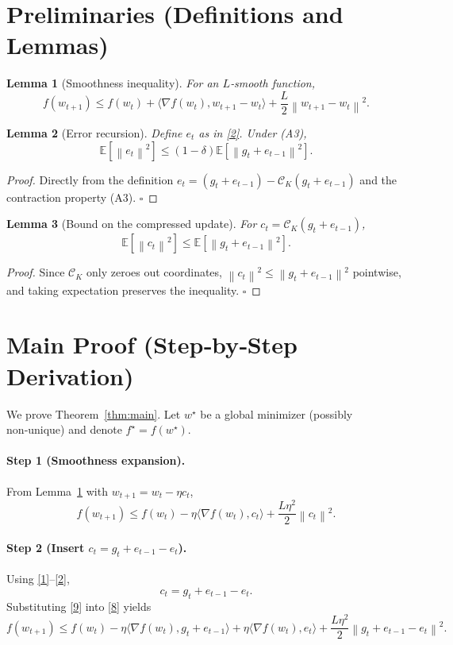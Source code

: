 \documentclass{article}
\newtheorem{lemma}{Lemma}
\newcommand{\E}{\mathbb{E}}
\newcommand{\norm}[1]{\left\|#1\right\|}
\newcommand{\cK}{\mathcal{C}_{K}}
\begin{document}
\section*{Preliminaries (Definitions and Lemmas)}
\begin{lemma}[Smoothness inequality]\label{lem:smooth}
For an $L$‑smooth function,
\[
f(w_{t+1})\le f(w_{t})+\langle\nabla f(w_{t}),w_{t+1}-w_{t}\rangle+\frac{L}{2}\norm{w_{t+1}-w_{t}}^{2}.
\tag{5}
\]
\end{lemma}
\begin{lemma}[Error recursion]\label{lem:error-bound}
Define $e_{t}$ as in \eqref{2}. Under (A3),
\[
\E\!\left[\norm{e_{t}}^{2}\right]\le (1-\delta)\E\!\left[\norm{g_{t}+e_{t-1}}^{2}\right].
\tag{6}
\]
\end{lemma}
\begin{proof}
Directly from the definition $e_{t}= (g_{t}+e_{t-1})-\cK(g_{t}+e_{t-1})$ and the contraction property (A3). \hfill $\square$
\end{proof}
\begin{lemma}[Bound on the compressed update]\label{lem:comp-update}
For $c_{t}= \cK(g_{t}+e_{t-1})$,
\[
\E\!\left[\norm{c_{t}}^{2}\right]\le \E\!\left[\norm{g_{t}+e_{t-1}}^{2}\right].
\tag{7}
\]
\end{lemma}
\begin{proof}
Since $\cK$ only zeroes out coordinates,
$\norm{c_{t}}^{2}\le \norm{g_{t}+e_{t-1}}^{2}$ pointwise, and taking expectation preserves the inequality. \hfill $\square$
\end{proof}

\section*{Main Proof (Step‑by‑Step Derivation)}
We prove Theorem~\ref{thm:main}. Let $w^{\star}$ be a global minimizer (possibly non‑unique) and denote $f^{\star}=f(w^{\star})$.

\paragraph{Step 1 (Smoothness expansion).}
From Lemma~\ref{lem:smooth} with $w_{t+1}=w_{t}-\eta c_{t}$,
\[
f(w_{t+1})\le f(w_{t})-\eta\langle\nabla f(w_{t}),c_{t}\rangle
+\frac{L\eta^{2}}{2}\norm{c_{t}}^{2}. \tag{8}
\]
\paragraph{Step 2 (Insert $c_{t}=g_{t}+e_{t-1}-e_{t}$).}
Using \eqref{1}–\eqref{2},
\[
c_{t}=g_{t}+e_{t-1}-e_{t}. \tag{9}
\]
Substituting \eqref{9} into \eqref{8} yields
\[
f(w_{t+1})\le f(w_{t})-\eta\langle\nabla f(w_{t}),g_{t}+e_{t-1}\rangle
+\eta\langle\nabla f(w_{t}),e_{t}\rangle
+\frac{L\eta^{2}}{2}\norm{g_{t}+e_{t-1}-e_{t}}^{2}. \tag{10}
\]
\end{document}

